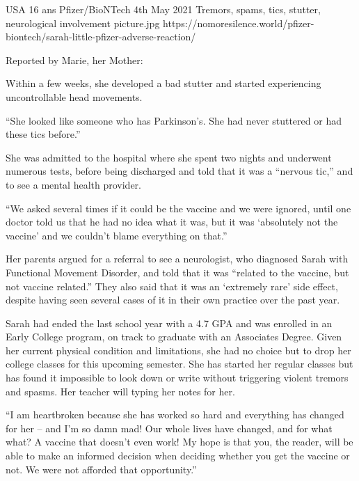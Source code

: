 {USA}
{16 ans}
{Pfizer/BioNTech}
{4th May 2021}
{Tremors, spams, tics, stutter, neurological involvement}
{picture.jpg}
{https://nomoresilence.world/pfizer-biontech/sarah-little-pfizer-adverse-reaction/}
{

Reported by Marie, her Mother:

Within a few weeks, she developed a bad stutter and started experiencing
uncontrollable head movements.

“She looked like someone who has Parkinson’s. She had never stuttered or had
these tics before.”

She was admitted to the hospital where she spent two nights and underwent
numerous tests, before being discharged and told that it was a “nervous tic,”
and to see a mental health provider.

“We asked several times if it could be the vaccine and we were ignored, until
one doctor told us that he had no idea what it was, but it was ‘absolutely not
the vaccine’ and we couldn’t blame everything on that.”

Her parents argued for a referral to see a neurologist, who diagnosed Sarah with
Functional Movement Disorder, and told that it was “related to the vaccine, but
not vaccine related.” They also said that it was an ‘extremely rare’ side
effect, despite having seen several cases of it in their own practice over the
past year.

Sarah had ended the last school year with a 4.7 GPA and was enrolled in an Early
College program, on track to graduate with an Associates Degree. Given her
current physical condition and limitations, she had no choice but to drop her
college classes for this upcoming semester. She has started her regular classes
but has found it impossible to look down or write without triggering violent
tremors and spasms. Her teacher will typing her notes for her.

“I am heartbroken because she has worked so hard and everything has changed for
her – and I’m so damn mad! Our whole lives have changed, and for what what? A
vaccine that doesn’t even work! My hope is that you, the reader, will be able to
make an informed decision when deciding whether you get the vaccine or not. We
were not afforded that opportunity.”

}
